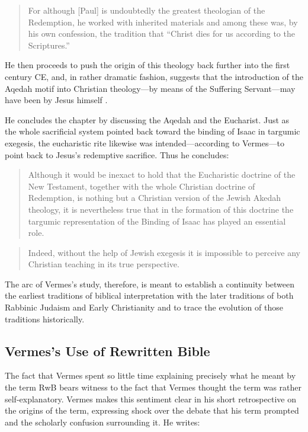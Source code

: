 \begin{quote}
For although {[}Paul{]} is undoubtedly the greatest theologian of the
Redemption, he worked with inherited materials and among these was, by
his own confession, the tradition that ``Christ dies for us according to
the Scriptures.''\autocite[221]{vermes1961}
\end{quote}

He then proceeds to push the origin of this theology back further into
the first century CE, and, in rather dramatic fashion, suggests that the
introduction of the Aqedah motif into Christian theology---by means of
the Suffering Servant---may have been by Jesus himself
\autocite[223]{vermes1961}.

He concludes the chapter by discussing the Aqedah and the Eucharist.
Just as the whole sacrificial system pointed back toward the binding of
Isaac in targumic exegesis, the eucharistic rite likewise was
intended---according to Vermes---to point back to Jesus's redemptive
sacrifice. Thus he concludes:

\begin{quote}
Although it would be inexact to hold that the Eucharistic doctrine of
the New Testament, together with the whole Christian doctrine of
Redemption, is nothing but a Christian version of the Jewish Akedah
theology, it is nevertheless true that in the formation of this doctrine
the targumic representation of the Binding of Isaac has played an
essential role.
\end{quote}

\begin{quote}
Indeed, without the help of Jewish exegesis it is impossible to perceive
any Christian teaching in its true
perspective.\autocite[227]{vermes1961}
\end{quote}

The arc of Vermes's study, therefore, is meant to establish a continuity
between the earliest traditions of biblical interpretation with the
later traditions of both Rabbinic Judaism and Early Christianity and to
trace the evolution of those traditions historically.

\subsection{Vermes's Use of Rewritten Bible}\label{vs-use-of-rwb}

The fact that Vermes spent so little time explaining precisely what he
meant by the term RwB bears witness to the fact that Vermes thought the
term was rather self-explanatory. Vermes makes this sentiment clear in
his short retrospective on the origins of the term, expressing shock
over the debate that his term prompted and the scholarly confusion
surrounding it. He writes:

